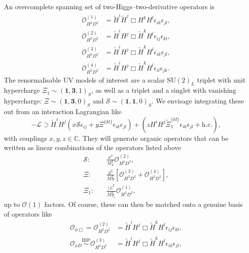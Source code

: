 An overcomplete spanning set of two-Higgs--two-derivative operators is
\begin{subequations}
  \begin{align}
    \mathcal{O}_{H^{2}D^{2}}^{(1)} &= \tilde{H}^{i}\tilde{H}^{j} \Box H^{k} H^{l} \epsilon_{ik} \epsilon_{jl}, \\
    \mathcal{O}_{H^{2}D^{2}}^{(2)} &= \tilde{H}^{i}H^{j} \Box \tilde{H}^{k} H^{l} \epsilon_{ij} \epsilon_{kl}, \\
    \mathcal{O}_{H^{2}D^{2}}^{(3)} &= \tilde{H}^{i}H^{j} \Box \tilde{H}^{k} H^{l} \epsilon_{ik} \epsilon_{jl}, \\
    \mathcal{O}_{H^{2}D^{2}}^{(4)} &= \tilde{H}^{i}H^{j} \Box \tilde{H}^{k} H^{l} \epsilon_{il} \epsilon_{jk}.
  \end{align}
\end{subequations}
The renormalisable UV models of interest are a scalar $\mathrm{SU}(2)_{L}$
triplet with unit hypercharge
$\Xi_{1} \sim (\mathbf{1}, \mathbf{3}, 1)_{S}$, as well as a triplet and a
singlet with vanishing hypercharge:
$\Xi\sim (\mathbf{1}, \mathbf{3}, 0)_{S}$ and
$\mathcal{S} \sim (\mathbf{1}, \mathbf{1}, 0)_{S}$. We envisage integrating
these out from an interaction Lagrangian like
\begin{equation}
  -\mathscr{L} \supset \tilde{H}^{i} H^{j} (x \mathcal{S} \epsilon_{ij} + y \Xi^{\{kl\}}\epsilon_{ik}\epsilon_{jl}) + (z H^{i}H^{j} \tilde{\Xi}_{1}^{\{kl\}} \epsilon_{ik} \epsilon_{jl} + \text{h.c.}),
\end{equation}
with couplings $x, y, z \in \mathbb{C}$. They will generate organic operators
that can be written as linear combinations of the operators listed above
\begin{subequations}
  \label{eq:ch2-organic-ops}
  \begin{align}
    \mathcal{S}: &\quad \frac{x^{2}}{M_{\mathcal{S}}^{2}} \mathcal{O}_{H^{2}D^{2}}^{(2)}, \\
    \Xi: &\quad \frac{y^{2}}{M_{\Xi}^{2}} \left[ \mathcal{O}_{H^{2}D^{2}}^{(3)} + \mathcal{O}_{H^{2}D^{2}}^{(4)} \right], \label{eq:ch2-organic-ops-2} \\
    \Xi_{1}: &\quad \frac{|z|^{2}}{M_{\Xi_{1}}^{2}} \mathcal{O}_{H^{2}D^{2}}^{(1)},
  \end{align}
\end{subequations}
up to $\mathcal{O}(1)$ factors. Of course, these can then be matched onto a
genuine basis of operators like
\begin{subequations}\label{eq:ch2-2h2d-basis}
  \begin{align}
    \mathcal{O}_{\phi \Box} = \mathcal{O}_{H^{2}D^{2}}^{(2)} &= \tilde{H}^{i}H^{j} \Box \tilde{H}^{k}H^{l} \epsilon_{ij} \epsilon_{kl}, \\
    \mathcal{O}_{\phi D} \overset{\text{IBP}}{\sim} \mathcal{O}_{H^{2}D^{2}}^{(3)} &= \tilde{H}^{i}H^{j} \Box \tilde{H}^{k}H^{l} \epsilon_{ik} \epsilon_{jl},
  \end{align}
\end{subequations}
